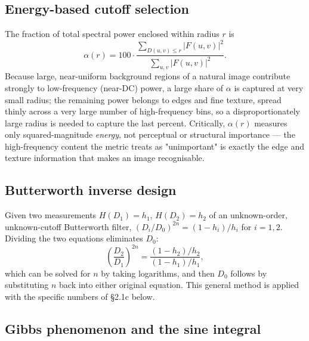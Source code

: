 \documentclass[11pt]{article}
\begin{document}
\subsection{Energy-based cutoff selection}

The fraction of total spectral power enclosed within radius $r$ is
\begin{equation}
  \alpha(r) = 100\cdot\frac{\sum_{D(u,v)\le r}|F(u,v)|^2}{\sum_{u,v}|F(u,v)|^2}.
\end{equation}
Because large, near-uniform background regions of a natural image contribute strongly to
low-frequency (near-DC) power, a large share of $\alpha$ is captured at very small radius; the
remaining power belongs to edges and fine texture, spread thinly across a very large number of
high-frequency bins, so a disproportionately large radius is needed to capture the last percent.
Critically, $\alpha(r)$ measures only squared-magnitude \emph{energy}, not perceptual or structural
importance --- the high-frequency content the metric treats as "unimportant" is exactly the edge
and texture information that makes an image recognisable.

\subsection{Butterworth inverse design}

Given two measurements $H(D_1)=h_1$, $H(D_2)=h_2$ of an unknown-order, unknown-cutoff Butterworth
filter, $(D_i/D_0)^{2n} = (1-h_i)/h_i$ for $i=1,2$. Dividing the two equations eliminates $D_0$:
\begin{equation}
  \left(\frac{D_2}{D_1}\right)^{2n} = \frac{(1-h_2)/h_2}{(1-h_1)/h_1},
\end{equation}
which can be solved for $n$ by taking logarithms, and then $D_0$ follows by substituting $n$ back
into either original equation. This general method is applied with the specific numbers of \S2.1c
below.

\subsection{Gibbs phenomenon and the sine integral}
\end{document}
